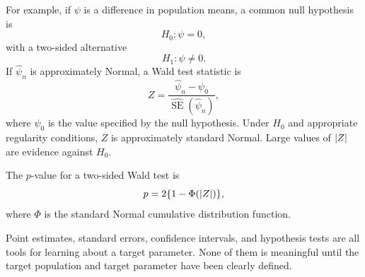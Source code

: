 For example, if $\psi$ is a difference in population means, a common null hypothesis is
\[
H_0:\psi=0,
\]
with a two-sided alternative
\[
H_1:\psi\ne 0.
\]
If $\hat\psi_n$ is approximately Normal, a Wald test statistic is
\[
Z=\frac{\hat\psi_n-\psi_0}{\widehat{\operatorname{SE}}(\hat\psi_n)},
\]
where $\psi_0$ is the value specified by the null hypothesis. Under $H_0$ and appropriate regularity conditions, $Z$ is approximately standard Normal. Large values of $\left\lvert Z\right\rvert$ are evidence against $H_0$.

The $p$-value for a two-sided Wald test is
\[
p=2\{1-\Phi(\left\lvert Z\right\rvert)\},
\]
where $\Phi$ is the standard Normal cumulative distribution function.

\begin{keyidea}
Point estimates, standard errors, confidence intervals, and hypothesis tests are all tools for learning about a target parameter. None of them is meaningful until the target population and target parameter have been clearly defined.
\end{keyidea}
